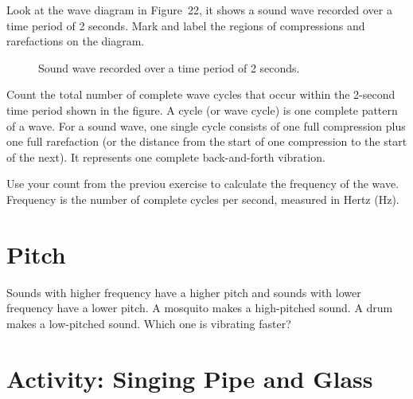 \documentclass{xtufte-handout}
\newcommand{\hertz}{Hz}
\begin{document}
 Look at the wave diagram in Figure~22, it shows a sound wave recorded over a time period of 2 seconds. Mark and label the regions of compressions and rarefactions on the diagram.

\begin{figure}[h]
  \caption{Sound wave recorded over a time period of 2 seconds.}\label{fig:frequency-exercise}
  \end{figure}

   Count the total number of complete wave cycles that occur within the 2-second time period shown in the figure. A cycle (or wave cycle) is one complete pattern of a wave. For a sound wave, one single cycle consists of one full compression plus one full rarefaction (or the distance from the start of one compression to the start of the next). It represents one complete back-and-forth vibration.

   Use your count from the previou exercise to calculate the frequency of the wave. Frequency is the number of complete cycles per second, measured in Hertz (\hertz).

\section{Pitch}
Sounds with higher frequency have a higher pitch and sounds with lower frequency have a lower pitch. A mosquito makes a high-pitched sound. A drum makes a low-pitched sound. Which one is vibrating faster?

\section{Activity: Singing Pipe and Glass}
\end{document}
